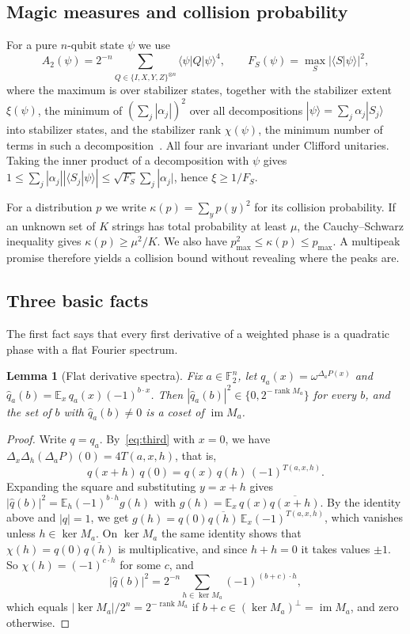 \documentclass[a4paper,onecolumn,11pt,unpublished]{quantumarticle}
\theoremstyle{plain}
\newtheorem{lemma}[theorem]{Lemma}
\theoremstyle{remark}
\newcommand{\F}{\mathbb{F}_2}
\newcommand{\ket}[1]{|#1\rangle}
\newcommand{\bra}[1]{\langle #1|}
\newcommand{\braket}[2]{\langle #1|#2\rangle}
\DeclareMathOperator{\rank}{rank}
\DeclareMathOperator{\img}{im}
\newcommand{\E}{\mathbb{E}}
\begin{document}
\subsection{Magic measures and collision probability}

For a pure $n$-qubit state $\psi$ we use
\[
A_2(\psi)=2^{-n}\sum_{Q\in\{I,X,Y,Z\}^{\otimes n}}\bra{\psi}Q\ket{\psi}^4,\qquad F_S(\psi)=\max_{S}|\braket{S}{\psi}|^2,
\]
where the maximum is over stabilizer states, together with the stabilizer extent $\xi(\psi)$, the minimum of $(\sum_j|\alpha_j|)^2$ over all decompositions $\ket{\psi}=\sum_j\alpha_j\ket{S_j}$ into stabilizer states, and the stabilizer rank $\chi(\psi)$, the minimum number of terms in such a decomposition~\cite{BBC19}. All four are invariant under Clifford unitaries. Taking the inner product of a decomposition with $\psi$ gives $1\le\sum_j|\alpha_j||\braket{S_j}{\psi}|\le\sqrt{F_S}\sum_j|\alpha_j|$, hence $\xi\ge 1/F_S$.

For a distribution $p$ we write $\kappa(p)=\sum_yp(y)^2$ for its collision probability. If an unknown set of $K$ strings has total probability at least $\mu$, the Cauchy--Schwarz inequality gives $\kappa(p)\ge\mu^2/K$. We also have $p_{\max}^2\le\kappa(p)\le p_{\max}$. A multipeak promise therefore yields a collision bound without revealing where the peaks are.

\subsection{Three basic facts}

The first fact says that every first derivative of a weighted phase is a quadratic phase with a flat Fourier spectrum.

\begin{lemma}[Flat derivative spectra]\label{lem:flat}
Fix $a\in\F^n$, let $q_a(x)=\omega^{\Delta_aP(x)}$ and $\hat q_a(b)=\E_x\,q_a(x)(-1)^{b\cdot x}$. Then $|\hat q_a(b)|^2\in\{0,2^{-\rank M_a}\}$ for every $b$, and the set of $b$ with $\hat q_a(b)\neq0$ is a coset of $\img M_a$.
\end{lemma}

\begin{proof}
Write $q=q_a$. By~\eqref{eq:third} with $x=0$, we have $\Delta_x\Delta_h(\Delta_aP)(0)=4T(a,x,h)$, that is,
\[
q(x+h)\,q(0)=q(x)\,q(h)\,(-1)^{T(a,x,h)}.
\]
Expanding the square and substituting $y=x+h$ gives $|\hat q(b)|^2=\E_h(-1)^{b\cdot h}g(h)$ with $g(h)=\E_x\,q(x)\overline{q(x+h)}$. By the identity above and $|q|=1$, we get $g(h)=q(0)\overline{q(h)}\,\E_x(-1)^{T(a,x,h)}$, which vanishes unless $h\in\ker M_a$. On $\ker M_a$ the same identity shows that $\chi(h)=q(0)\overline{q(h)}$ is multiplicative, and since $h+h=0$ it takes values $\pm1$. So $\chi(h)=(-1)^{c\cdot h}$ for some $c$, and
\[
|\hat q(b)|^2=2^{-n}\sum_{h\in\ker M_a}(-1)^{(b+c)\cdot h},
\]
which equals $|\ker M_a|/2^n=2^{-\rank M_a}$ if $b+c\in(\ker M_a)^\perp=\img M_a$, and zero otherwise.
\end{proof}
\end{document}
